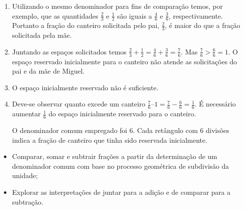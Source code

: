 \begin{multicols}{2}
\begin{solucao}{}{}
\begin{enumerate} [\quad a)] %
  \item     Utilizando o mesmo denominador para fins de comparação temos, por exemplo, que as quantidades     $\frac{2}{3}$     e     $\frac{1}{2}$     são iguais a     $\frac{4}{6}$     e     $\frac{3}{6}$, respectivamente. Portanto a fração do canteiro solicitada pelo pai,     $\frac{2}{3}$, é maior do que a fração solicitada pela mãe.
  \item     Juntando as espaços solicitados temos     $\frac{2}{3} + \frac{1}{2} = \frac{4}{6} + \frac{3}{6} = \frac{7}{6}$. Mas     $\frac{7}{6}>\frac{6}{6}=1$. O espaço reservado inicialmente para o canteiro não atende as solicitações do pai e da mãe de Miguel.
  \newpage
  \item     O espaço inicialmente reservado não é suficiente.
  \item     Deve-se observar quanto excede um canteiro  $\frac{7}{6} – 1 = \frac{7}{6} - \frac{6}{6} = \frac{1}{6}$. É necessário aumentar $\frac{1}{6}$ do espaço inicialmente reservado para o canteiro.

O denominador comum empregado foi 6. Cada retângulo com 6 divisões indica a fração de canteiro que tinha sido reservada inicialmente.

\begin{center}
\end{center}


\end{enumerate} %

\end{solucao}
\end{multicols}

\begin{objetivos}[label=chap5-ativ14]{}{}


  \begin{itemize} %
    \item       Comparar, somar e subtrair frações a partir da determinação de um denominador comum com base no processo geométrica de subdivisão da unidade;
    \item       Explorar as interpretações de juntar para a adição e de comparar para a subtração.
\end{itemize} %

\end{objetivos}

